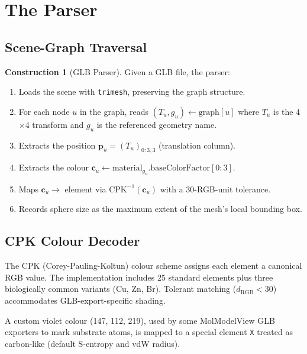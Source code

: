 \documentclass[11pt,twocolumn,a4paper]{article}
\theoremstyle{definition}
\newtheorem{construction}[theorem]{Construction}
\theoremstyle{remark}
\begin{document}
\section{The Parser}
\label{sec:parser}

\subsection{Scene-Graph Traversal}

\begin{construction}[GLB Parser]
\label{cons:parser}
Given a GLB file, the parser:
\begin{enumerate}[nosep]
\item Loads the scene with \texttt{trimesh}, preserving the graph
  structure.
\item For each node $u$ in the graph, reads
  $(T_u, g_u) \leftarrow \mathrm{graph}[u]$ where $T_u$ is the 4$\times$4
  transform and $g_u$ is the referenced geometry name.
\item Extracts the position $\mathbf{p}_u = (T_u)_{0:3, 3}$ (translation
  column).
\item Extracts the colour
  $\mathbf{c}_u \leftarrow \mathrm{material}_{g_u}.\mathrm{baseColorFactor}[0:3]$.
\item Maps $\mathbf{c}_u \to$ element via
  $\mathrm{CPK}^{-1}(\mathbf{c}_u)$ with a 30-RGB-unit tolerance.
\item Records sphere size as the maximum extent of the mesh's local
  bounding box.
\end{enumerate}
\end{construction}

\subsection{CPK Colour Decoder}

The CPK (Corey-Pauling-Koltun) colour scheme assigns each element a
canonical RGB value. The implementation includes 25 standard elements
plus three biologically common variants (Cu, Zn, Br). Tolerant matching
($d_{\mathrm{RGB}} < 30$) accommodates GLB-export-specific shading.

A custom violet colour (147, 112, 219), used by some MolModelView GLB
exporters to mark substrate atoms, is mapped to a special element
\texttt{X} treated as carbon-like (default S-entropy and vdW radius).
\end{document}
